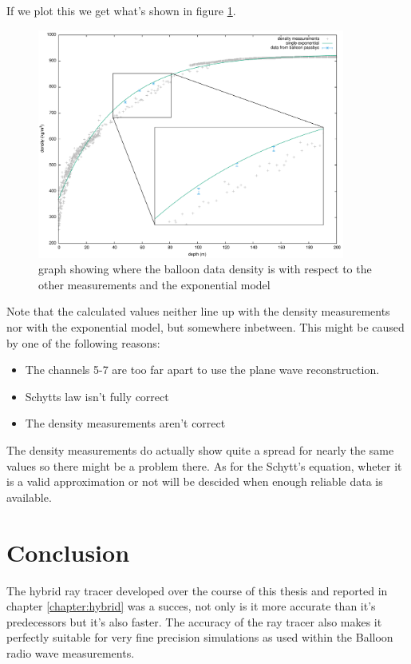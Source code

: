 \documentclass[11pt,a4paper,faculty=we,language=en,doctype=report]{cls/ugent-doc}
\begin{document}
If we plot this we get what's shown in figure
\ref{fig:BalloonDensity6And7}.
\begin{figure}
	\centering
	\includegraphics[width=0.9\textwidth]{DensityBalloonWithZoom.pdf}
	\caption{graph showing where the balloon data density is with
	respect to the other measurements and the exponential model}
	\label{fig:BalloonDensity6And7}
\end{figure}
Note that the calculated values neither line up with the density
measurements nor with the exponential model, but somewhere
inbetween. This might be caused by one of the following reasons:
\begin{itemize}
	\item The channels 5-7 are too far apart to use the plane
		wave reconstruction.
	\item Schytts law isn't fully correct
	\item The density measurements aren't correct
\end{itemize}
The density measurements do actually show quite a spread for nearly
the same values so there might be a problem there.  As for the
Schytt's equation, wheter it is a valid approximation or not will be
descided when enough reliable data is available.  
\chapter*{Conclusion}
The hybrid ray tracer developed over the course of this thesis and reported in
chapter \ref{chapter:hybrid} was a succes, not only is it more accurate than
it's predecessors but it's also faster.  The accuracy of the ray tracer also
makes it perfectly suitable for very fine precision simulations as used within
the Balloon radio wave measurements.
\end{document}

